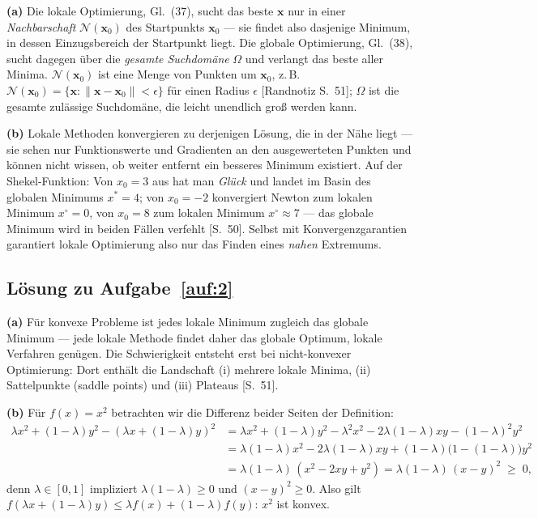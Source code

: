 \documentclass[a4paper,11pt]{scrartcl}
\begin{document}
\textbf{(a)} Die lokale Optimierung, Gl.~(37), sucht das beste $\mathbf{x}$ nur in einer
\emph{Nachbarschaft} $\mathcal{N}(\mathbf{x}_0)$ des Startpunkts $\mathbf{x}_0$ --- sie
findet also dasjenige Minimum, in dessen Einzugsbereich der Startpunkt liegt. Die globale
Optimierung, Gl.~(38), sucht dagegen über die \emph{gesamte Suchdomäne} $\Omega$ und
verlangt das beste aller Minima. $\mathcal{N}(\mathbf{x}_0)$ ist eine Menge von Punkten um
$\mathbf{x}_0$, z.\,B.
$\mathcal{N}(\mathbf{x}_0) = \{\mathbf{x} : \|\mathbf{x} - \mathbf{x}_0\| < \epsilon\}$
für einen Radius $\epsilon$ [Randnotiz S.~51]; $\Omega$ ist die gesamte zulässige
Suchdomäne, die leicht unendlich groß werden kann.

\textbf{(b)} Lokale Methoden konvergieren zu derjenigen Lösung, die in der Nähe liegt ---
sie sehen nur Funktionswerte und Gradienten an den ausgewerteten Punkten und können nicht
wissen, ob weiter entfernt ein besseres Minimum existiert. Auf der Shekel-Funktion:
Von $x_0 = 3$ aus hat man \emph{Glück} und landet im Basin des globalen Minimums
$x^* = 4$; von $x_0 = -2$ konvergiert Newton zum lokalen Minimum $x^\circ = 0$, von
$x_0 = 8$ zum lokalen Minimum $x^\circ \approx 7$ --- das globale Minimum wird in beiden
Fällen verfehlt [S.~50]. Selbst mit Konvergenzgarantien garantiert lokale Optimierung also
nur das Finden eines \emph{nahen} Extremums.

\subsection*{Lösung zu Aufgabe~\ref{auf:2}}

\textbf{(a)} Für konvexe Probleme ist jedes lokale Minimum zugleich das globale Minimum
--- jede lokale Methode findet daher das globale Optimum, lokale Verfahren genügen.
Die Schwierigkeit entsteht erst bei nicht-konvexer Optimierung: Dort enthält die
Landschaft (i) mehrere lokale Minima, (ii) Sattelpunkte (saddle points) und
(iii) Plateaus [S.~51].

\textbf{(b)} Für $f(x) = x^2$ betrachten wir die Differenz beider Seiten der Definition:
\begin{align*}
  \lambda x^2 + (1-\lambda)y^2 - (\lambda x + (1-\lambda)y)^2
  &= \lambda x^2 + (1-\lambda)y^2 - \lambda^2 x^2 - 2\lambda(1-\lambda)xy - (1-\lambda)^2 y^2\\
  &= \lambda(1-\lambda)x^2 - 2\lambda(1-\lambda)xy + (1-\lambda)\bigl(1 - (1-\lambda)\bigr)y^2\\
  &= \lambda(1-\lambda)\,(x^2 - 2xy + y^2)
   = \lambda(1-\lambda)\,(x-y)^2 \;\geq\; 0,
\end{align*}
denn $\lambda \in [0,1]$ impliziert $\lambda(1-\lambda) \geq 0$ und $(x-y)^2 \geq 0$.
Also gilt $f(\lambda x + (1-\lambda)y) \leq \lambda f(x) + (1-\lambda)f(y)$: $x^2$ ist
konvex.
\end{document}

